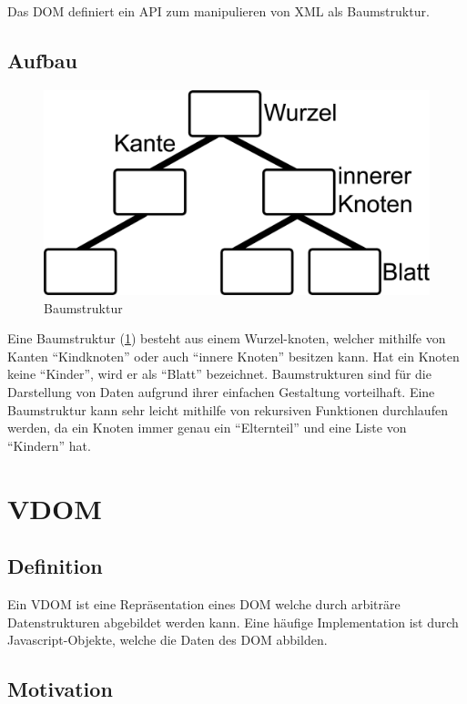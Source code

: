 Das \ac{DOM} definiert ein \ac{API} zum manipulieren von \ac{XML} als
Baumstruktur. \cite{harold}

\subsection{Aufbau}
\begin{figure}
  \includegraphics[width=\linewidth]{images/binarytree.jpg}
  \caption{Baumstruktur}
  \label{fig:binarytree}
\end{figure}

Eine Baumstruktur (\ref{fig:binarytree}) besteht aus einem Wurzel-knoten,
welcher mithilfe von Kanten ``Kindknoten'' oder auch ``innere Knoten'' besitzen
kann. Hat ein Knoten keine ``Kinder'', wird er als ``Blatt'' bezeichnet.
Baumstrukturen sind für die Darstellung von Daten aufgrund ihrer einfachen
Gestaltung vorteilhaft. Eine Baumstruktur kann sehr leicht mithilfe von
rekursiven Funktionen durchlaufen werden, da ein Knoten immer genau ein
``Elternteil'' und eine Liste von ``Kindern'' hat.

\section{\acl{VDOM}}
\subsection{Definition}

Ein \ac{VDOM} ist eine Repräsentation eines \ac{DOM} welche durch arbiträre
Datenstrukturen abgebildet werden kann. Eine häufige Implementation ist durch
Javascript-Objekte, welche die Daten des \ac{DOM} abbilden.

\subsection{Motivation}

